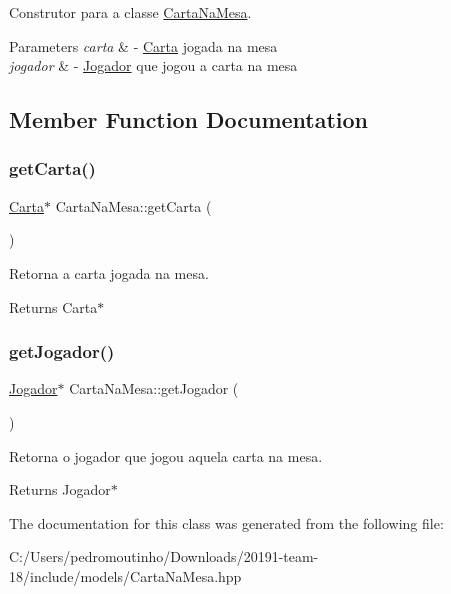 Construtor para a classe \mbox{\hyperlink{class_carta_na_mesa}{Carta\+Na\+Mesa}}. 


\begin{DoxyParams}{Parameters}
{\em carta} & -\/ \mbox{\hyperlink{class_carta}{Carta}} jogada na mesa \\
\hline
{\em jogador} & -\/ \mbox{\hyperlink{class_jogador}{Jogador}} que jogou a carta na mesa \\
\hline
\end{DoxyParams}


\subsection{Member Function Documentation}
\mbox{\label{class_carta_na_mesa_a2019e0269144f552f218ae795b7ab599}} 
\subsubsection{\texorpdfstring{getCarta()}{getCarta()}}
{\footnotesize\ttfamily \mbox{\hyperlink{class_carta}{Carta}}$\ast$ Carta\+Na\+Mesa\+::get\+Carta (\begin{DoxyParamCaption}{ }\end{DoxyParamCaption})}



Retorna a carta jogada na mesa. 

\begin{DoxyReturn}{Returns}
Carta$\ast$ 
\end{DoxyReturn}
\mbox{\label{class_carta_na_mesa_a2dd1806034ff0ca5cb9c02a28bee709f}} 
\subsubsection{\texorpdfstring{getJogador()}{getJogador()}}
{\footnotesize\ttfamily \mbox{\hyperlink{class_jogador}{Jogador}}$\ast$ Carta\+Na\+Mesa\+::get\+Jogador (\begin{DoxyParamCaption}{ }\end{DoxyParamCaption})}



Retorna o jogador que jogou aquela carta na mesa. 

\begin{DoxyReturn}{Returns}
Jogador$\ast$ 
\end{DoxyReturn}


The documentation for this class was generated from the following file\+:\begin{DoxyCompactItemize}
\item 
C\+:/\+Users/pedromoutinho/\+Downloads/20191-\/team-\/18/include/models/Carta\+Na\+Mesa.\+hpp\end{DoxyCompactItemize}
